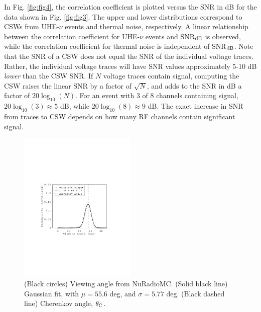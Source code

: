 \documentclass[amsmath,amssymb,aps,prd,10pt,twocolumn,showkeys]{revtex4}
\begin{document}
\begin{itemize}
In Fig. \ref{fig:fig4}, the correlation coefficient is plotted versus the SNR in dB for the data shown in Fig. \ref{fig:fig3}.  The upper and lower distributions correspond to CSWs from UHE-$\nu$ events and thermal noise, respectively.  A linear relationship between the correlation coefficient for UHE-$\nu$ events and SNR$_{\rm dB}$ is observed, while the correlation coefficient for thermal noise is independent of SNR$_{\rm dB}$.  Note that the SNR of a CSW does not equal the SNR of the individual voltage traces.  Rather, the individual voltage traces will have SNR values approximately 5-10 dB \textit{lower} than the CSW SNR.  If $N$ voltage traces contain signal, computing the CSW raises the linear SNR by a factor of $\sqrt{N}$, and adds to the SNR in dB a factor of $20\log_{10}(N)$.  For an event with 3 of 8 channels containing signal, $20\log_{10}(3)\approx 5$ dB, while $20\log_{10}(8)\approx 9$ dB.  The exact increase in SNR from traces to CSW depends on how many RF channels contain significant signal.

\begin{figure}
\centering
\includegraphics[width=0.5\textwidth,trim=3.25cm 8.25cm 4.5cm 9.0cm,clip=true]{Aug18_plot1.pdf}
\caption{\label{fig:fig5} (Black circles) Viewing angle from NuRadioMC. (Solid black line) Gaussian fit, with $\mu = 55.6$ deg, and $\sigma = 5.77$ deg.  (Black dashed line) Cherenkov angle, $\theta_{\rm C}$.}
\end{figure}


\end{itemize}
\end{document}
